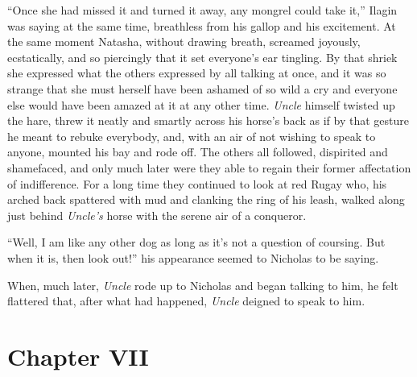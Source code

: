``Once she had missed it and turned it away, any mongrel could
take it,'' Ilagin was saying at the same time, breathless from
his gallop and his excitement. At the same moment Natasha,
without drawing breath, screamed joyously, ecstatically, and so
piercingly that it set everyone's ear tingling. By that shriek
she expressed what the others expressed by all talking at once,
and it was so strange that she must herself have been ashamed of
so wild a cry and everyone else would have been amazed at it at
any other time. \emph{Uncle} himself twisted up the hare, threw
it neatly and smartly across his horse's back as if by that
gesture he meant to rebuke everybody, and, with an air of not
wishing to speak to anyone, mounted his bay and rode off. The
others all followed, dispirited and shamefaced, and only much
later were they able to regain their former affectation of
indifference. For a long time they continued to look at red Rugay
who, his arched back spattered with mud and clanking the ring of
his leash, walked along just behind \emph{Uncle's} horse with the
serene air of a conqueror.

``Well, I am like any other dog as long as it's not a question of
coursing. But when it is, then look out!'' his appearance seemed
to Nicholas to be saying.

When, much later, \emph{Uncle} rode up to Nicholas and began
talking to him, he felt flattered that, after what had happened,
\emph{Uncle} deigned to speak to him.


\chapter*{Chapter VII}
\ifaudio     
{} 
\fi

